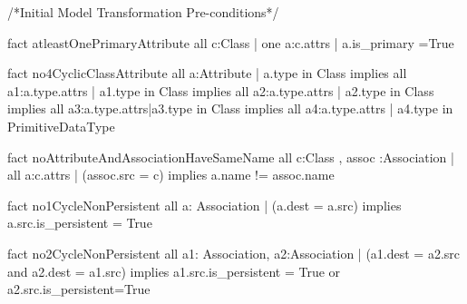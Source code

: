
/*Initial Model Transformation Pre-conditions*/


fact atleastOnePrimaryAttribute 
{
	all c:Class | one a:c.attrs | a.is_primary =True
}

fact no4CyclicClassAttribute
{
	all a:Attribute | a.type in Class implies all a1:a.type.attrs | a1.type in 
	Class implies all a2:a.type.attrs | a2.type in Class implies all a3:a.type.attrs|a3.type
	 in Class implies all a4:a.type.attrs | a4.type in PrimitiveDataType
}

fact noAttributeAndAssociationHaveSameName
{
	all c:Class , assoc :Association | 
	all a:c.attrs | (assoc.src = c) implies a.name != assoc.name
}

fact no1CycleNonPersistent 
{
all a: Association | (a.dest = a.src) implies a.src.is_persistent = True 
}

fact no2CycleNonPersistent
{
	all a1: Association, a2:Association |
	(a1.dest = a2.src and a2.dest = a1.src) implies 
	a1.src.is_persistent = True or a2.src.is_persistent=True
}
